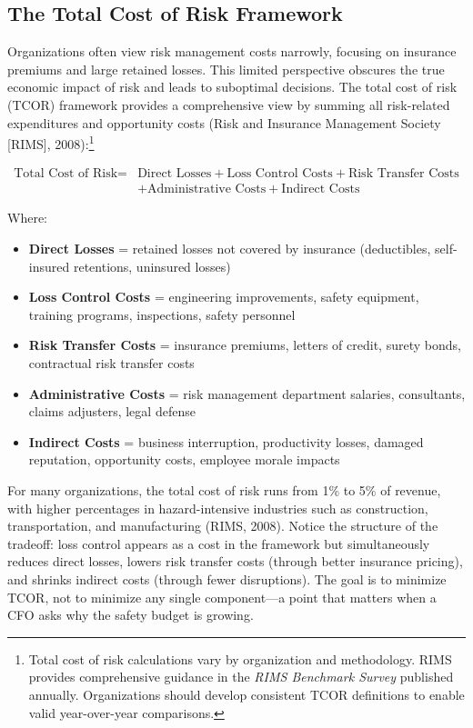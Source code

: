\documentclass[11pt,openany]{book}
\providecommand{\tightlist}{\setlength{\itemsep}{0pt}\setlength{\parskip}{0pt}}
\begin{document}
\subsection{The Total Cost of Risk Framework}

Organizations often view risk management costs narrowly, focusing on insurance
premiums and large retained losses. This limited perspective obscures the true
economic impact of risk and leads to suboptimal decisions. The total cost of
risk (TCOR) framework provides a comprehensive view by summing all
risk-related expenditures and opportunity costs (Risk and Insurance Management
Society [RIMS], 2008):\footnote{Total cost of risk calculations vary by
organization and methodology. RIMS provides comprehensive guidance in the
\emph{RIMS Benchmark Survey} published annually. Organizations should develop
consistent TCOR definitions to enable valid year-over-year comparisons.}

\[
\begin{split}
\text{Total Cost of Risk} = {}& \text{Direct Losses} + \text{Loss Control Costs}
  + \text{Risk Transfer Costs} \\
  & + \text{Administrative Costs} + \text{Indirect Costs}
\end{split}
\]

Where:

\begin{itemize}\tightlist
  \item \textbf{Direct Losses} = retained losses not covered by insurance
        (deductibles, self-insured retentions, uninsured losses)
  \item \textbf{Loss Control Costs} = engineering improvements, safety
        equipment, training programs, inspections, safety personnel
  \item \textbf{Risk Transfer Costs} = insurance premiums, letters of credit,
        surety bonds, contractual risk transfer costs
  \item \textbf{Administrative Costs} = risk management department salaries,
        consultants, claims adjusters, legal defense
  \item \textbf{Indirect Costs} = business interruption, productivity losses,
        damaged reputation, opportunity costs, employee morale impacts
\end{itemize}

For many organizations, the total cost of risk runs from 1\% to 5\% of
revenue, with higher percentages in hazard-intensive industries such as
construction, transportation, and manufacturing (RIMS, 2008). Notice the
structure of the tradeoff: loss control appears as a cost in the framework but
simultaneously reduces direct losses, lowers risk transfer costs (through
better insurance pricing), and shrinks indirect costs (through fewer
disruptions). The goal is to minimize TCOR, not to minimize any single
component---a point that matters when a CFO asks why the safety budget is
growing.
\end{document}
